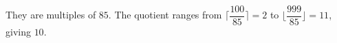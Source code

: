 They are multiples of $ 85 $. The quotient ranges from $\lceil\dfrac{100}{85}\rceil=2 $ to $\lfloor\dfrac{999}{85}\rfloor=11 $, giving $\boxed{10}$.
